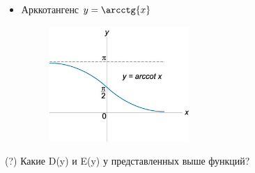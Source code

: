 \begin{itemize}
\begin{figure}[h!]
    \end{figure}
    \item Арккотангенс $y = \arcctg{x}$
    \begin{figure}[h!]
    \centering
    \includegraphics[width=0.5\textwidth]{img/arcctg.jpg}
    \end{figure}
\end{itemize}

(?) Какие D(y) и E(y) у представленных выше функций?